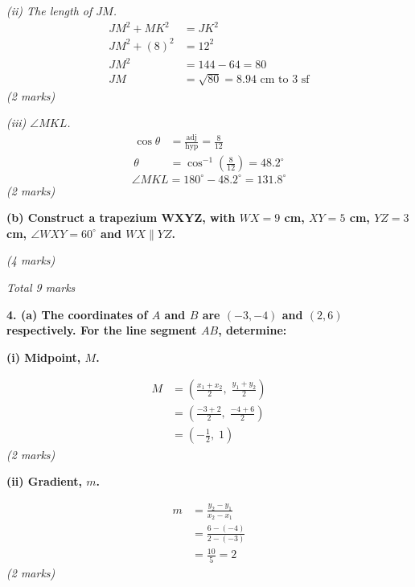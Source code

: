 \documentclass[12pt,a4paper]{article}
\newcommand{\qhead}[1]{\vspace{0.6em}\noindent\textbf{\large #1}\par\vspace{0.3em}}
\newcommand{\subhead}[1]{\vspace{0.3em}\noindent\textbf{#1}\par}
\newcommand{\qmarks}[1]{\hfill\textit{(#1)}}
\begin{document}
\textit{(ii) The length of $JM$.}
\begin{align*}
JM^2 + MK^2 &= JK^2 \\
JM^2 + (8)^2 &= 12^2 \\
JM^2 &= 144 - 64 = 80 \\
JM &= \sqrt{80} = 8.94 \text{ cm to 3 sf}
\end{align*}
\qmarks{2 marks}

\textit{(iii) $\angle MKL$.}
\begin{align*}
\cos\theta &= \frac{\text{adj}}{\text{hyp}} = \frac{8}{12} \\
\theta &= \cos^{-1}\!\left(\frac{8}{12}\right) = 48.2^{\circ}
\end{align*}
\[ \angle MKL = 180^{\circ} - 48.2^{\circ} = 131.8^{\circ} \]
\qmarks{2 marks}

\subhead{(b) Construct a trapezium WXYZ, with $WX = 9$ cm, $XY = 5$ cm, $YZ = 3$ cm, $\angle WXY = 60^{\circ}$ and $WX \parallel YZ$.}

\begin{center}
\end{center}
\qmarks{4 marks}

\hfill\textit{Total 9 marks}

\newpage
\qhead{4. (a) The coordinates of $A$ and $B$ are $(-3,-4)$ and $(2,6)$ respectively. For the line segment $AB$, determine:}

\subhead{(i) Midpoint, $M$.}
\begin{align*}
M &= \left( \frac{x_1 + x_2}{2},\; \frac{y_1 + y_2}{2} \right) \\
&= \left( \frac{-3 + 2}{2},\; \frac{-4 + 6}{2} \right) \\
&= \left( -\tfrac{1}{2},\; 1 \right)
\end{align*}
\qmarks{2 marks}

\subhead{(ii) Gradient, $m$.}
\begin{align*}
m &= \frac{y_2 - y_1}{x_2 - x_1} \\
&= \frac{6 - (-4)}{2 - (-3)} \\
&= \frac{10}{5} = 2
\end{align*}
\qmarks{2 marks}
\end{document}
